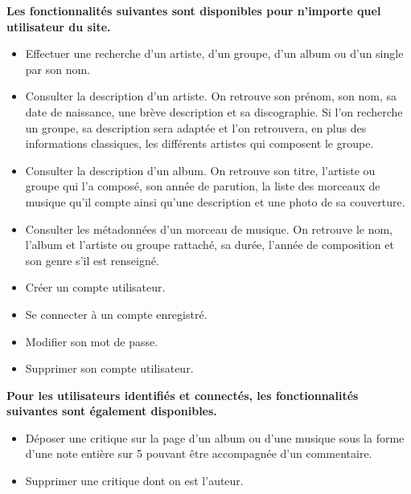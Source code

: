         \begin{paragraphe}
            \textbf{Les fonctionnalités suivantes sont disponibles pour n'importe quel utilisateur du site.}
            \vspace{1em}
            \begin{itemize}
                \item Effectuer une recherche d'un artiste, d'un groupe, d'un album ou d'un single
                par son nom.
                \item Consulter la description d'un artiste. On retrouve son prénom, son nom, sa
                date de naissance, une brève description et sa discographie. Si l'on
                recherche un groupe, sa description sera adaptée et l'on retrouvera,
                en plus des informations classiques, les différents artistes qui
                composent le groupe.
                \item Consulter la description d'un album. On retrouve son titre,
                l'artiste ou groupe qui l'a composé, son année de parution, la liste des morceaux de 
                musique qu'il compte ainsi qu'une description et une photo de sa couverture.
                \item Consulter les métadonnées d'un morceau de musique. On retrouve
                le nom, l'album et l'artiste ou groupe rattaché, sa durée, l'année de composition
                et son genre s'il est renseigné.
                \item Créer un compte utilisateur.
                \item Se connecter à un compte enregistré.
                \item Modifier son mot de passe.
                \item Supprimer son compte utilisateur.
            \end{itemize}
        \end{paragraphe}
        
\newpage

        \begin{paragraphe}
            \textbf{Pour les utilisateurs identifiés et connectés, les fonctionnalités suivantes sont également 
            disponibles.}
            \vspace{1em}
            \begin{itemize}
                \item Déposer une critique sur la page d'un album ou
                d'une musique sous la forme d'une note entière sur 5 pouvant être accompagnée d'un commentaire.
                \item Supprimer une critique dont on est l'auteur.
            \end{itemize}
        \end{paragraphe}

